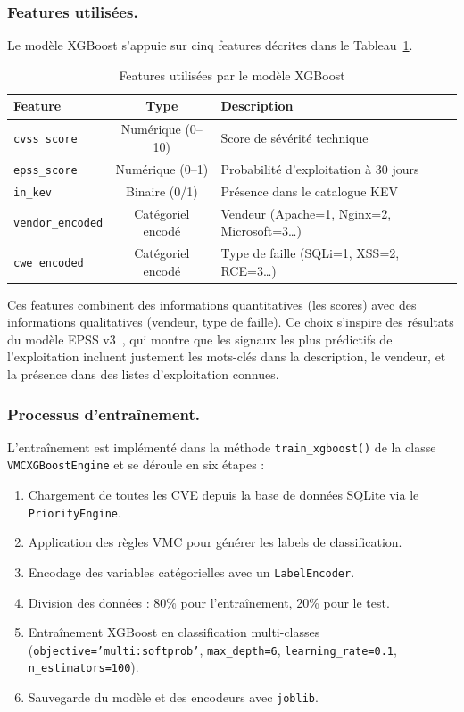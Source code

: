 \documentclass[runningheads]{llncs}
\begin{document}
\subsubsection{Features utilisées.}

Le modèle XGBoost s'appuie sur cinq features décrites dans le Tableau~\ref{tab:features}.

\begin{table}[h]
\centering
\caption{Features utilisées par le modèle XGBoost}
\label{tab:features}
\begin{tabular}{|l|c|l|}
\hline
\textbf{Feature} & \textbf{Type} & \textbf{Description} \\
\hline
\texttt{cvss\_score}    & Numérique (0--10) & Score de sévérité technique \\
\texttt{epss\_score}    & Numérique (0--1)  & Probabilité d'exploitation à 30 jours \\
\texttt{in\_kev}        & Binaire (0/1)     & Présence dans le catalogue KEV \\
\texttt{vendor\_encoded} & Catégoriel encodé & Vendeur (Apache=1, Nginx=2, Microsoft=3\ldots) \\
\texttt{cwe\_encoded}   & Catégoriel encodé & Type de faille (SQLi=1, XSS=2, RCE=3\ldots) \\
\hline
\end{tabular}
\end{table}

Ces features combinent des informations quantitatives (les scores) avec des informations qualitatives (vendeur, type de faille). Ce choix s'inspire des résultats du modèle EPSS v3~\cite{jacobs2023epss}, qui montre que les signaux les plus prédictifs de l'exploitation incluent justement les mots-clés dans la description, le vendeur, et la présence dans des listes d'exploitation connues.

\subsubsection{Processus d'entraînement.}

L'entraînement est implémenté dans la méthode \texttt{train\_xgboost()} de la classe \texttt{VMCXGBoostEngine} et se déroule en six étapes :

\begin{enumerate}
    \item Chargement de toutes les CVE depuis la base de données SQLite via le \texttt{PriorityEngine}.
    \item Application des règles VMC pour générer les labels de classification.
    \item Encodage des variables catégorielles avec un \texttt{LabelEncoder}.
    \item Division des données : 80\% pour l'entraînement, 20\% pour le test.
    \item Entraînement XGBoost en classification multi-classes (\texttt{objective='multi:softprob'}, \texttt{max\_depth=6}, \texttt{learning\_rate=0.1}, \texttt{n\_estimators=100}).
    \item Sauvegarde du modèle et des encodeurs avec \texttt{joblib}.
\end{enumerate}
\end{document}
